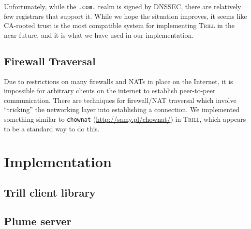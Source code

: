 \documentclass[11pt]{article}
\newcommand{\Trill}{\textsc{Trill}\xspace}
\begin{document}
Unfortunately, while the \verb`.com.` realm is signed by DNSSEC, there are
relatively few registrars that support it. While we hope the situation improves,
it seems like CA-rooted trust is the most compatible system for implementing
\Trill in the near future, and it is what we have used in our implementation.

\subsection{Firewall Traversal}
Due to restrictions on many firewalls and NATs in place on the Internet, it is
impossible for arbitrary clients on the internet to establish peer-to-peer
communication. There are techniques for firewall/NAT traversal which involve
``tricking'' the networking layer into establishing a connection. We implemented
something similar to \texttt{chownat} (\url{http://samy.pl/chownat/}) in \Trill,
which appears to be a standard way to do this.

\section{Implementation}

\subsection{Trill client library}

\subsection{Plume server}
\end{document}
